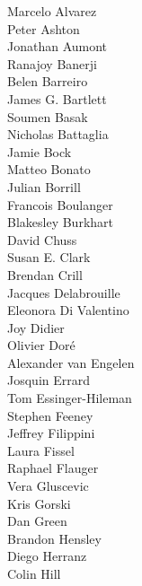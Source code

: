 \documentclass[PICOReport.tex]{subfiles}
\begin{document}
\footnotesize {

\begin{multicols}{4}
Marcelo Alvarez                 \\	
Peter Ashton                    \\	
Jonathan Aumont                 \\	
Ranajoy Banerji                 \\	
Belen Barreiro                  \\	
James G. Bartlett               \\	
Soumen Basak                    \\	
Nicholas Battaglia              \\	
Jamie Bock                      \\	
Matteo Bonato                   \\	
Julian Borrill                  \\	
Francois Boulanger              \\	
Blakesley Burkhart              \\	
David Chuss                     \\	
Susan E. Clark                  \\	
Brendan Crill                   \\	
Jacques Delabrouille            \\	
Eleonora Di Valentino           \\	
Joy Didier                      \\	
Olivier Dor\'e                  \\	
Alexander van Engelen           \\	
Josquin Errard                  \\	
Tom Essinger-Hileman            \\	
Stephen Feeney                  \\	
Jeffrey Filippini               \\	
Laura Fissel                    \\	
Raphael Flauger                 \\	
Vera Gluscevic                  \\	
Kris Gorski                     \\	
Dan Green                       \\	
Brandon Hensley                 \\	
Diego Herranz                   \\	
Colin Hill                      \\	

\end{multicols}}
\end{document}
